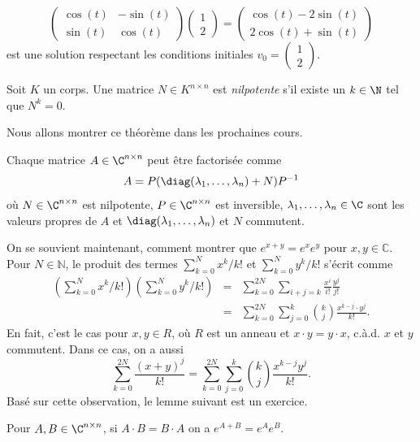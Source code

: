 \begin{example}
\begin{displaymath}
\begin{pmatrix}
    \cos(t)&-\sin(t)\\
    \sin(t)&\cos(t)
  \end{pmatrix} \begin{pmatrix}
    1\\
    2
\end{pmatrix}   =  \begin{pmatrix}
    \cos(t)-2\sin(t)\\
    2\cos(t)+\sin(t)
\end{pmatrix} 
\end{displaymath}
est une solution respectant les conditions initiales  $v_0 = 
\begin{pmatrix}
    1\\
    2
\end{pmatrix} $. 
\end{example}






\begin{definition}
  \label{def:29}Soit $K$ un corps. 
  Une matrice $N ∈ K^{n ×n}$ est \emph{nilpotente} s'il existe un $k \in \N$ tel que $N^k = 0$. 
\end{definition}

Nous allons montrer ce théorème dans les prochaines cours.  
\begin{theorem}
  \label{thr:32}
  Chaque matrice $A \in \C^{n \times n}$ peut être factorisée comme 
  \begin{displaymath}
    A = P ( \diag(\lambda_1,\dots,\lambda_n) + N) P^{-1}
  \end{displaymath}
où $N \in \C^{n \times n}$ est nilpotente, $P \in \C^{n \times n}$ est inversible,  $\lambda_1,\dots,\lambda_n \in \C$ sont les valeurs propres de $A$ et $\diag(\lambda_1,\dots,\lambda_n)$ et $N$ commutent. 
\end{theorem}
%
On se souvient maintenant, comment montrer que $e^{x+y}  = e^xe^y$ pour $x,y∈ ℂ$.  Pour $N ∈ ℕ$, le produit des termes
$∑_{k=0}^N x^k / k! $ et $∑_{k=0}^N y^k / k! $ s'écrit comme 
\begin{eqnarray}
  \left(∑_{k=0}^N x^k / k! \right) \left(∑_{k=0}^N y^k / k! \right) & = & \displaystyle  ∑_{k=0}^{2N}  ∑_{i+j = k} \frac{x^i}{  i!} \frac{y^j}{ j!} \\
  & = &  \displaystyle ∑_{k=0}^{2N}  ∑_{j = 0}^k \binom{k}{j} \frac{x^{k-j} ⋅ y^{j} }{k!}.   
\end{eqnarray}
En fait, c'est le cas pour $x,y ∈ R$, où $R$ est un anneau et $x ⋅ y  = y ⋅x$, c.à.d. $x$ et $y$ commutent.  Dans ce cas, on a aussi
\begin{displaymath}
  \displaystyle  ∑_{k=0}^{2N} \frac{(x+y)^j}{k!} =  \displaystyle  ∑_{k=0}^{2N}  ∑_{j = 0}^k \binom{k}{j} \frac{x^{k-j} y^{j} }{k!}.   
\end{displaymath}
%
Basé sur cette observation, le lemme suivant est un exercice. 
\begin{lemma}
  \label{lem:18}
  Pour $A,B \in \C^{n \times n}$, si $A\cdot B = B \cdot A$ on a $e^{A+B} = e^A e^B$. 
\end{lemma}



